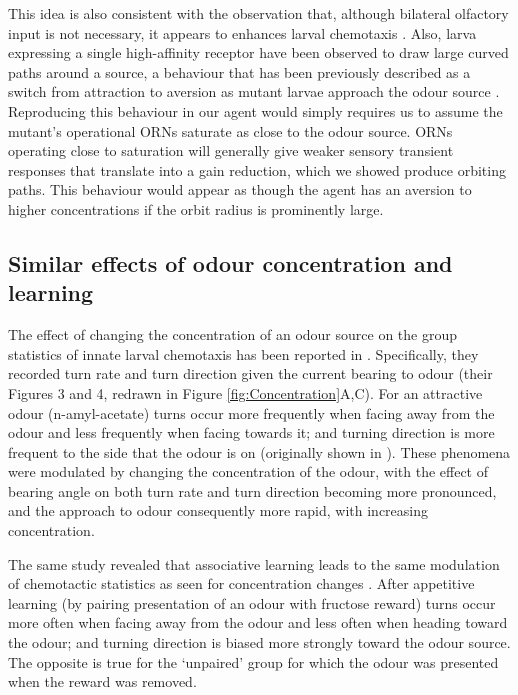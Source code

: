 \documentclass[11pt,a4paper]{article}
\begin{document}
 This idea is also consistent with the observation that, although bilateral olfactory input is not necessary, it appears to enhances larval chemotaxis \citep{louis2008bilateral}. Also, larva expressing a single high-affinity receptor have been observed to draw large curved paths around a source, a behaviour that has been previously described as a switch from attraction to aversion as mutant larvae approach the odour source \citep{gomez2011active, kreher2008translation}. %
  Reproducing this behaviour in our agent would simply requires us to assume the mutant's operational ORNs saturate as close to the odour source. ORNs operating close to saturation will generally give weaker sensory transient responses that translate into a gain reduction, which we showed produce orbiting paths. This behaviour would appear as though the agent has an aversion to higher concentrations if the orbit radius is prominently large.
 
 


\subsection{Similar effects of odour concentration and learning}
The effect of changing the concentration of an odour source on the group statistics of innate larval chemotaxis has been reported in \citep{schleyer2015learning}. Specifically, they recorded turn rate and turn direction given the current bearing to odour (their Figures 3 and 4, redrawn in Figure \ref{fig:Concentration}A,C). For an attractive odour (n-amyl-acetate) turns occur more frequently when facing away from the odour and less frequently when facing towards it; and turning direction is more frequent to the side that the odour is on (originally shown in \citet{gomez2011active}). These phenomena were modulated by changing the concentration of the odour, with the effect of bearing angle on both turn rate and turn direction becoming more pronounced, and the approach to odour consequently more rapid, with increasing concentration. 

The same \cite{schleyer2015learning} study revealed that associative learning leads to the same modulation of chemotactic statistics as seen for concentration changes \citep[][Figures 3 and 4]{schleyer2015learning}. After appetitive learning (by pairing presentation of an odour with fructose reward) turns occur more often when facing away from the odour and less often when heading toward the odour; and turning direction is biased more strongly toward the odour source. The opposite is true for the ‘unpaired’ group for which the odour was presented when the reward was removed. 
\end{document}
